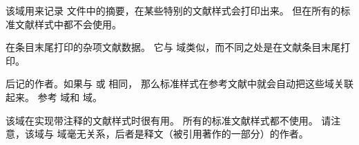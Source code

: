 \begin{fieldlist}




该域用来记录  文件中的摘要，在某些特别的文献样式会打印出来。
但在所有的标准文献样式中都不会使用。




在条目末尾打印的杂项文献数据。
它与  域类似，而不同之处是在文献条目末尾打印。




后记的作者。如果与  或  相同，
那么标准样式在参考文献中就会自动把这些域关联起来。
参考  域和  域。




该域在实现带注释的文献样式时很有用。
所有的标准文献样式都不使用。
请注意，该域与  域毫无关系，后者是释文（被引用著作的一部分）的作者。




\end{fieldlist}
